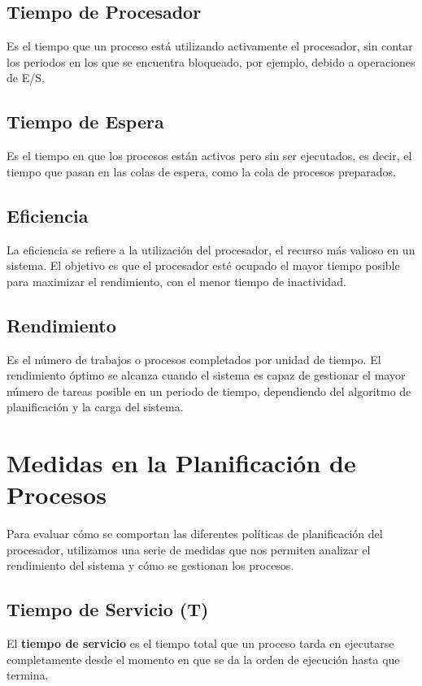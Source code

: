 \subsection{Tiempo de Procesador}
Es el tiempo que un proceso está utilizando activamente el procesador, sin contar los periodos en los que se encuentra bloqueado, por ejemplo, debido a operaciones de E/S.

\subsection{Tiempo de Espera}
Es el tiempo en que los procesos están activos pero sin ser ejecutados, es decir, el tiempo que pasan en las colas de espera, como la cola de procesos preparados.

\subsection{Eficiencia}
La eficiencia se refiere a la utilización del procesador, el recurso más valioso en un sistema. El objetivo es que el procesador esté ocupado el mayor tiempo posible para maximizar el rendimiento, con el menor tiempo de inactividad.

\subsection{Rendimiento}
Es el número de trabajos o procesos completados por unidad de tiempo. El rendimiento óptimo se alcanza cuando el sistema es capaz de gestionar el mayor número de tareas posible en un periodo de tiempo, dependiendo del algoritmo de planificación y la carga del sistema.

\section{Medidas en la Planificación de Procesos}

Para evaluar cómo se comportan las diferentes políticas de planificación del procesador, utilizamos una serie de medidas que nos permiten analizar el rendimiento del sistema y cómo se gestionan los procesos.

\subsection{Tiempo de Servicio (T)}
El \textbf{tiempo de servicio} es el tiempo total que un proceso tarda en ejecutarse completamente desde el momento en que se da la orden de ejecución hasta que termina.

